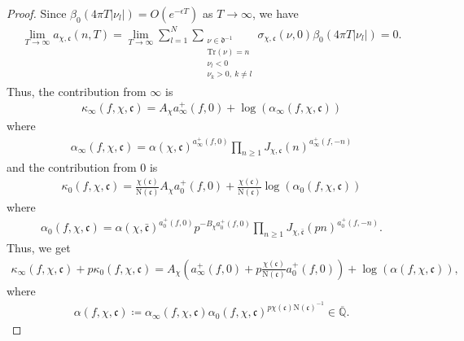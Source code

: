 \documentclass[twoside,a4paper,10pt]{article} %
\newcommand{\8}{\infty}
\newcommand{\Qbar}{\overline{\Q}}
\newcommand{\Q}{\mathbb{Q}}
\newcommand{\dfrak}{\mathfrak{d}}
\newcommand{\cfrak}{\mathfrak{c}}
\newcommand{\Tr}{\mathrm{Tr}}
\newcommand{\N}{\mathrm{N}}
\theoremstyle{mytheoremstyle}
\newtheorem{cor}{Corollary}[thm]
\theoremstyle{remark}
\numberwithin{equation}{section}
\begin{document}
\begin{proof}
Since $\beta_0(4\pi T \vert \nu_l \vert)=O(e^{-\epsilon T})$ as $T \rightarrow \8$, we have
\begin{align}
\lim_{T \rightarrow \8} a_{\chi,\cfrak}(n,T) =\lim_{T \rightarrow \8}\sum_{l=1}^N \sum_{\substack{\nu \in \dfrak^{-1} \\ \Tr(\nu)=n \\ \nu_l<0 \\ \nu_k>0, \ k \neq l}}\sigma_{\chi,\cfrak}(\nu,0)\beta_0(4\pi T \vert \nu_l \vert)=0.
\end{align}
Thus, the contribution from $\8$ is 
\begin{align}
\kappa_\8(f,\chi,\cfrak) =A_{\chi}a^+_\8(f,0) + \log(\alpha_\8(f,\chi,\cfrak))
\end{align}
where
\begin{align}
\alpha_\8(f,\chi,\cfrak)=\alpha(\chi,\cfrak)^{a^+_\8(f,0)}\prod_{n \geq 1}  J_{\chi,\cfrak}(n)^{ a^+_\8(f,-n)}
\end{align}
and the contribution from $0$ is
\begin{align}
\kappa_0(f,\chi,\cfrak) =\frac{\chi(\cfrak)}{\N(\cfrak)} A_{\chi} a^+_0(f,0)  + \frac{\chi(\cfrak)}{\N(\cfrak)}\log(\alpha_0(f,\chi,\cfrak))
\end{align}
where
\begin{align}
\alpha_0(f,\chi,\cfrak)=\alpha(\chi,\bar{\cfrak})^{a^+_0(f,0)}p^{-B_\chi a^+_0(f,0)}\prod_{n \geq 1}  J_{\chi,\bar{\cfrak}}(pn)^{ a^+_0(f,-n)}.
\end{align}
Thus, we get
\begin{align}
\kappa_\8(f,\chi,\cfrak)+p\kappa_0(f,\chi,\cfrak)= A_{\chi} \left (a^+_\8(f,0)+p \frac{\chi(\cfrak)}{\N(\cfrak)} a^+_0(f,0) \right ) +\log(\alpha(f,\chi,\cfrak)),
\end{align}
where
\begin{align}
\alpha(f,\chi,\cfrak) \coloneqq \alpha_\8(f,\chi,\cfrak) \alpha_0(f,\chi,\cfrak)^{p\chi(\cfrak)\N(\cfrak)^{-1}} \in \Qbar.
\end{align}
\end{proof}
%

\printbibliography
\end{document}
